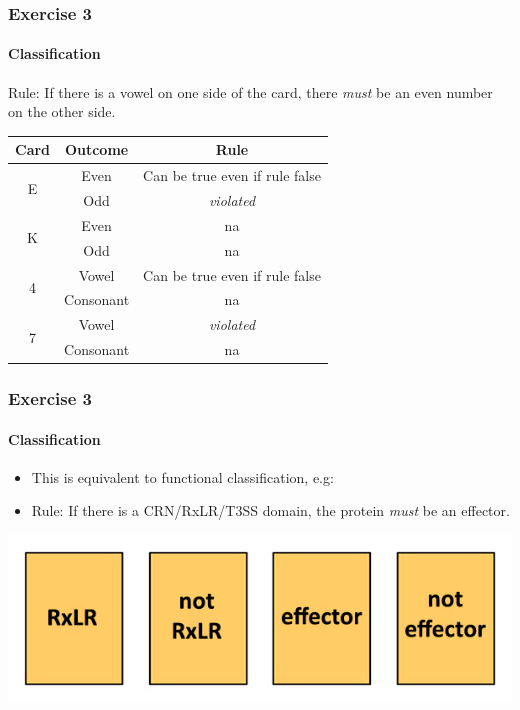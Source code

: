 \begin{frame}
  \frametitle{Exercise 3}
  \framesubtitle{Classification}
  Rule: If there is a vowel on one side of the card, there \textit{must} be an even number on the other side.    
  \begin{center}
  \begin{tabular}{c|c|c}
	  Card & Outcome & Rule \\
	  \hline
	  \hline
	    \multirow{2}{*}{E} & Even & Can be true even if rule false \\
	                                & Odd & \emph{violated} \\
	  \hline
	    \multirow{2}{*}{K} & Even & na \\
	                                & Odd & na \\	    
	  \hline
	    \multirow{2}{*}{4} & Vowel & Can be true even if rule false \\
	                                & Consonant & na \\
	  \hline
	    \multirow{2}{*}{7} & Vowel & \emph{violated} \\
	                                & Consonant & na \\	    
  \end{tabular}
  \end{center}
\end{frame}

\begin{frame}
  \frametitle{Exercise 3}
  \framesubtitle{Classification}
  \begin{itemize}
    \item This is equivalent to functional classification, e.g:
    \item Rule: If there is a CRN/RxLR/T3SS domain, the protein \textit{must} be an effector.
  \end{itemize}
  \includegraphics[width=\textwidth]{images/wason_rxlr}
\end{frame}
  

